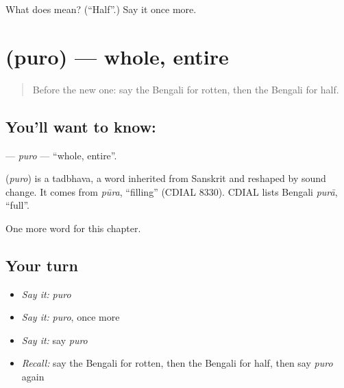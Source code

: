\begin{tcolorbox}[breakable,colback=teal!4,colframe=teal!35!black,title={Before you move on}]
What does  mean? (\textquotedblleft{}Half\textquotedblright{}.) Say it once more.
\end{tcolorbox}
\section[\texorpdfstring{\bn{পুরো} (puro)}{পুরো (puro)}]{ (puro) — whole, entire}

\label{lesson:BN-C162-puro}



\begin{quote}
Before the new one: say the Bengali for rotten, then the Bengali for half.
\end{quote}

\subsection*{You'll want to know: }
\textbf{} — \emph{puro} — \textquotedblleft{}whole, entire\textquotedblright{}.

\begin{cousinweb}
\textbf{} (\emph{puro}) is a tadbhava, a word inherited from Sanskrit and reshaped by sound change. It comes from \emph{pūra}, \textquotedblleft{}filling\textquotedblright{} (CDIAL 8330). CDIAL lists Bengali \emph{purā}, \textquotedblleft{}full\textquotedblright{}.
\end{cousinweb}

\begin{grammarlens}[title={What you've built}]
One more word for this chapter.
\end{grammarlens}

\subsection*{Your turn}
\begin{itemize}
\raggedright
  \item \emph{Say it:} \emph{puro}
  \item \emph{Say it:} \emph{puro}, once more
  \item \emph{Say it:} say \emph{puro}
  \item \emph{Recall:} say the Bengali for rotten, then the Bengali for half, then say \emph{puro} again
\end{itemize}

